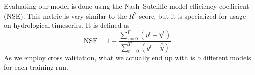 Evaluating our model is done using the Nash–Sutcliffe model efficiency coefficient (NSE). \cite{NSE}
This metric is very similar to the $R^2$ score, but it is specialized for usage 
on hydrological timeseries.
It is defined as 
\begin{equation}
    \text{NSE} = 1 - \frac{\sum_{t=0}^T\left( y^t - \hat{y}^t\right)}{\sum_{t=0}^T\left(y^t - \bar{\hat{y}}\right)} \label{NSE}
\end{equation}
As we employ cross validation, what we actually end up with is 5 different models 
for each training run. 
